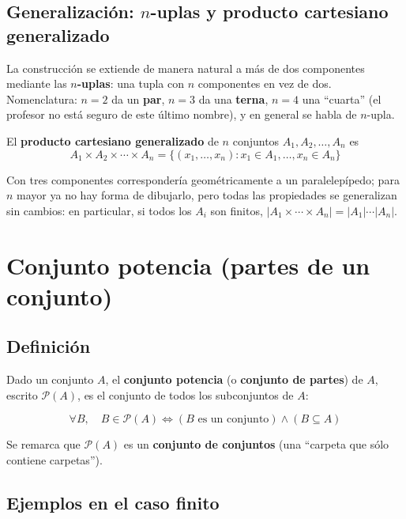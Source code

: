 \documentclass[12pt,a4paper]{article}
\begin{document}


\subsection{Generalización: \texorpdfstring{$n$}{n}-uplas y producto cartesiano generalizado}

La construcción se extiende de manera natural a más de dos componentes mediante las \textbf{$n$-uplas}: una tupla con $n$ componentes en vez de dos. Nomenclatura: $n=2$ da un \textbf{par}, $n=3$ da una \textbf{terna}, $n=4$ una ``cuarta'' (el profesor no está seguro de este último nombre), y en general se habla de $n$-upla.

El \textbf{producto cartesiano generalizado} de $n$ conjuntos $A_1,A_2,\dots,A_n$ es
$$A_1 \times A_2 \times \cdots \times A_n = \{(x_1,\dots,x_n) : x_1\in A_1,\dots,x_n \in A_n\}$$

Con tres componentes correspondería geométricamente a un paralelepípedo; para $n$ mayor ya no hay forma de dibujarlo, pero todas las propiedades se generalizan sin cambios: en particular, si todos los $A_i$ son finitos, $|A_1\times\cdots\times A_n| = |A_1|\cdots|A_n|$.

\section{Conjunto potencia (partes de un conjunto)}

\subsection{Definición}

Dado un conjunto $A$, el \textbf{conjunto potencia} (o \textbf{conjunto de partes}) de $A$, escrito $\mathcal P(A)$, es el conjunto de todos los subconjuntos de $A$:

\begin{keybox}
$$\boxed{\forall B,\quad B \in \mathcal P(A) \iff (B \text{ es un conjunto}) \wedge (B \subseteq A)}$$
\end{keybox}

Se remarca que $\mathcal P(A)$ es un \textbf{conjunto de conjuntos} (una ``carpeta que sólo contiene carpetas'').

\subsection{Ejemplos en el caso finito}
\end{document}
